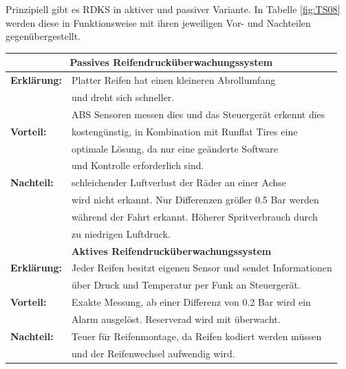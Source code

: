 \begin{flushleft}
	                Prinzipiell gibt es RDKS in aktiver und passiver Variante. In Tabelle \ref{fig:TS08} werden diese in Funktionsweise mit ihren jeweiligen
	                Vor- und Nachteilen gegenübergestellt.
	
	                \begin{table}
	                    \begin{tabularx}{\textwidth} {l|l}
	                        
	                        
	                        \multicolumn{2}{c}{\textbf{Passives Reifendrucküberwachungssystem}}\\
	                        \hline
	                        \textbf{Erklärung:} & Platter Reifen hat einen kleineren Abrollumfang \\ & und dreht sich schneller.\\ & ABS Sensoren messen dies und das Steuergerät erkennt dies\\
	                        \hline
	                        \textbf{Vorteil:} & kostengünstig, in Kombination mit Runflat Tires eine \\ & optimale Lösung, da nur eine geänderte Software \\ & und Kontrolle erforderlich sind.\\
	                        \hline
	                        \textbf{Nachteil:} & schleichender Luftverlust der Räder an einer Achse \\ &  wird nicht erkannt. Nur Differenzen größer 0.5 Bar werden \\ & während der Fahrt erkannt. Höherer Spritverbrauch durch \\ & zu niedrigen Luftdruck.\\
	                        \multicolumn{2}{c}{\textbf{Aktives Reifendrucküberwachungssystem}}\\
	                        \hline
	                        \textbf{Erklärung:} & Jeder Reifen besitzt eigenen Sensor und sendet Informationen \\ & über Druck und Temperatur per Funk an Steuergerät.\\
	                        \hline
	                        \textbf{Vorteil:} & Exakte Messung, ab einer Differenz von 0.2 Bar wird ein \\ & Alarm ausgelöst. Reserverad wird mit überwacht.\\
	                        \hline
	                        \textbf{Nachteil:}  & Teuer für Reifenmontage, da Reifen kodiert werden müssen\\ & und der Reifenwechsel aufwendig wird.\\
	

\end{tabularx}
\end{table}
\end{flushleft}
